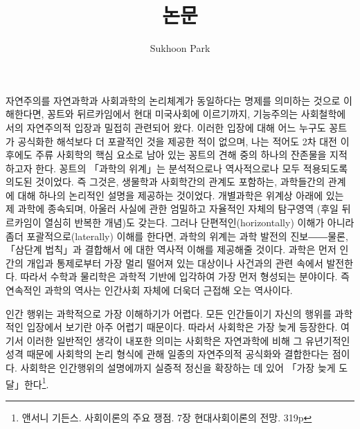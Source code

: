 \documentclass[11pt, a4paper]{article}
\begin{document}
\title{논문}
\author{Sukhoon Park}
\maketitle

\tableofcontents

\newpage

\begin{abstract}

    
\end{abstract}


\newpage
\section{}

\subsection{}

자연주의를 자연과학과 사회과학의 논리체계가 동일하다는 명제를 의미하는 것으로 이해한다면, 꽁트와 뒤르카임에서 현대 미국사회에 이르기까지, 기능주의는 사회철학에서의 자연주의적 입장과 밀접히 관련되어 왔다. 이러한 입장에 대해 어느 누구도 꽁트가 공식화한 해석보다 더 포괄적인 것을 제공한 적이 없으며, 나는 적어도 2차 대전 이후에도 주류 사회학의 핵심 요소로 남아 있는 꽁트의 견해 중의 하나의 잔존물을 지적하고자 한다. 꽁트의 「과학의 위계」는 분석적으로나 역사적으로나 모두 적용되도록 의도된 것이었다. 즉 그것은, 생물학과 사회학간의 관계도 포함하는, 과학들간의 관계에 대해 하나의 논리적인 설명을 제공하는 것이었다. 개별과학은 위계상 아래에 있는 제 과학에 종속되며, 아울러 사실에 관한 엄밀하고 자율적인 자체의 탐구영역 (후일 뒤르카임이 열심히 반복한 개념)도 갖는다. 그러나 단편적인(horizontally) 이해가 아니라 좀더 포괄적으로(laterally) 이해를 한다면, 과학의 위계는 과학 발전의 진보――물론, 「삼단계 법칙」과 결합해서 에 대한 역사적 이해를 제공해줄 것이다. 과학은 먼저 인간의 개입과 통제로부터 가장 멀리 떨어져 있는 대상이나 사건과의 관련 속에서 발전한다. 따라서 수학과 물리학은 과학적 기반에 입각하여 가장 먼저 형성되는 분야이다. 즉 연속적인 과학의 역사는 인간사회 자체에 더욱더 근접해 오는 역사이다.


인간 행위는 과학적으로 가장 이해하기가 어렵다. 모든 인간들이기 자신의 행위를 과학적인 입장에서 보기란 아주 어렵기 때문이다. 따라서 사회학은 가장 늦게 등장한다. 여기서 이러한 일반적인 생각이 내포한 의미는 사회학은 자연과학에 비해 그 유년기적인 성격 때문에 사회학의 논리 형식에 관해 일종의 자연주의적 공식화와 결합한다는 점이다. 사회학은 인간행위의 설명에까지 실증적 정신을 확장하는 데 있어 「가장 늦게 도달」한다\footnote{앤서니 기든스. 사회이론의 주요 쟁점. 7장 현대사회이론의 전망. 319p}. \\
\end{document}
